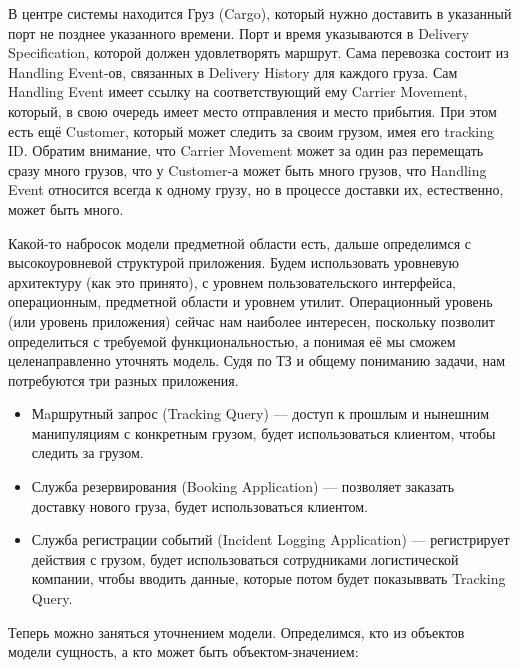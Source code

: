 \documentclass[a5paper]{article}
\begin{document}
В центре системы находится Груз (Cargo), который нужно доставить в указанный порт не позднее указанного времени. Порт и время указываются в Delivery Specification, которой должен удовлетворять маршрут. Сама перевозка состоит из Handling Event-ов, связанных в Delivery History для каждого груза. Сам Handling Event имеет ссылку на соответствующий ему Carrier Movement, который, в свою очередь имеет место отправления и место прибытия. При этом есть ещё Customer, который может следить за своим грузом, имея его tracking ID. Обратим внимание, что Carrier Movement может за один раз перемещать сразу много грузов, что у Customer-а может быть много грузов, что Handling Event относится всегда к одному грузу, но в процессе доставки их, естественно, может быть много.

Какой-то набросок модели предметной области есть, дальше определимся с высокоуровневой структурой приложения. Будем использовать уровневую архитектуру (как это принято), с уровнем пользовательского интерфейса, операционным, предметной области и уровнем утилит. Операционный уровень (или уровень приложения) сейчас нам наиболее интересен, поскольку позволит определиться с требуемой функциональностью, а понимая её мы сможем целенаправленно уточнять модель. Судя по ТЗ и общему пониманию задачи, нам потребуются три разных приложения.

\begin{itemize}
    \item Мaршрутный запрос (Tracking Query) --- доступ к прошлым и нынешним манипуляциям с конкретным грузом, будет использоваться клиентом, чтобы следить за грузом.
    \item Служба резервирования (Booking Application) --- позволяет заказать доставку нового груза, будет использоваться клиентом.
    \item Служба регистрации событий (Incident Logging Application) --- регистрирует действия с грузом, будет использоваться сотрудниками логистической компании, чтобы вводить данные, которые потом будет показыввать Tracking Query.
\end{itemize}

Теперь можно заняться уточнением модели. Определимся, кто из объектов модели сущность, а кто может быть объектом-значением:
\end{document}
